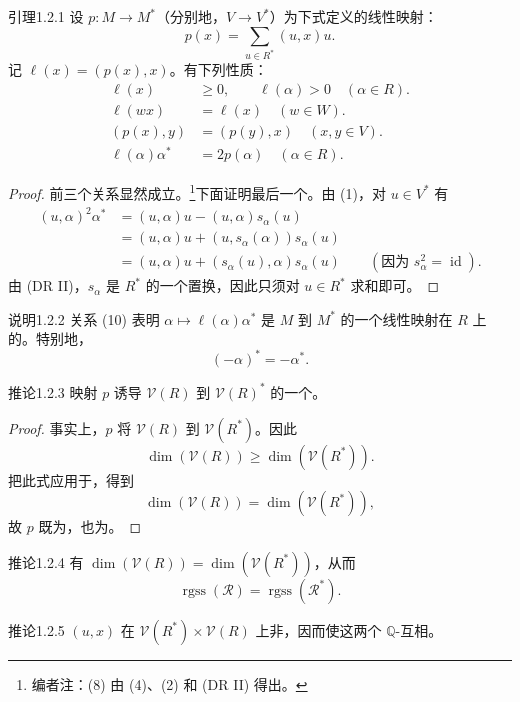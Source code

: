 \begin{SGAresult}{引理}{1.2.1}
设 $p:M\to M^*$（分别地，$V\to V^*$）为下式定义的线性映射：
\[p(x)=\sum_{u\in R^*}(u,x)u.\tag{6}\]
记 $\ell(x)=(p(x),x)$。有下列性质：
\begin{align}
\ell(x)&\geq0,\qquad\ell(\alpha)>0\quad(\alpha\in R).\tag{7}\\
\ell(wx)&=\ell(x)\quad(w\in W).\tag{8}\\
(p(x),y)&=(p(y),x)\quad(x,y\in V).\tag{9}\\
\ell(\alpha)\alpha^*&=2p(\alpha)\quad(\alpha\in R).\tag{10}
\end{align}
\end{SGAresult}
\begin{proof}
前三个关系显然成立。\footnote{编者注：(8) 由 (4)、(2) 和 (DR II) 得出。}下面证明最后一个。由 (1)，对 $u\in V^*$ 有
\begin{align*}
(u,\alpha)^2\alpha^*&=(u,\alpha)u-(u,\alpha)s_\alpha(u)\\
&=(u,\alpha)u+(u,s_\alpha(\alpha))s_\alpha(u)\\
&=(u,\alpha)u+(s_\alpha(u),\alpha)s_\alpha(u)\qquad(\text{因为 }s_\alpha^2=\operatorname{id}).
\end{align*}
由 (DR II)，$s_\alpha$ 是 $R^*$ 的一个置换，因此只须对 $u\in R^*$ 求和即可。
\end{proof}
\begin{SGAresult}{说明}{1.2.2}
关系 (10) 表明 $\alpha\mapsto\ell(\alpha)\alpha^*$ 是 $M$ 到 $M^*$ 的一个线性映射在 $R$ 上的。特别地，
\[(-\alpha)^*=-\alpha^*.\]
\end{SGAresult}
\begin{SGAresult}{推论}{1.2.3}
映射 $p$ 诱导 $\mathscr V(R)$ 到 $\mathscr V(R)^*$ 的一个。
\end{SGAresult}
\begin{proof}
事实上，$p$ 将 $\mathscr V(R)$ 到 $\mathscr V(R^*)$。因此
\[\dim(\mathscr V(R))\geq\dim(\mathscr V(R^*)).\]
把此式应用于，得到
\[\dim(\mathscr V(R))=\dim(\mathscr V(R^*)),\]
故 $p$ 既为，也为。
\end{proof}
\begin{SGAresult}{推论}{1.2.4}
有 $\dim(\mathscr V(R))=\dim(\mathscr V(R^*))$，从而
\[\operatorname{rgss}(\mathscr R)=\operatorname{rgss}(\mathscr R^*).\]
\end{SGAresult}
\begin{SGAresult}{推论}{1.2.5}
 $(u,x)$ 在 $\mathscr V(R^*)\times\mathscr V(R)$ 上非，因而使这两个 $\mathbb Q$-互相。
\end{SGAresult}
